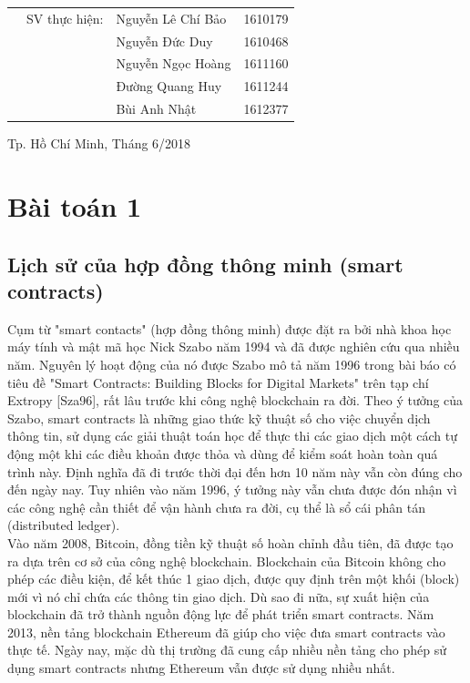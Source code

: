 \documentclass[a4paper]{article}
\begin{document}
\begin{titlepage}
\begin{table}[h]
\begin{tabular}{rrlr}
& SV thực hiện: & Nguyễn Lê Chí Bảo & 1610179 \\
& & Nguyễn Đức Duy & 1610468 \\
& & Nguyễn Ngọc Hoàng & 1611160 \\
& & Đường Quang Huy & 1611244 \\
& & Bùi Anh Nhật & 1612377 \\
\end{tabular}
\end{table}
\vspace{1.2cm}
\begin{center}
{\footnotesize Tp. Hồ Chí Minh, Tháng 6/2018}
\end{center}
\end{titlepage}



\newpage
\tableofcontents
\newpage



\section{Bài toán 1}
\subsection{Lịch sử của hợp đồng thông minh (smart contracts)}
Cụm từ "smart contacts" (hợp đồng thông minh) được đặt ra bởi nhà khoa học máy tính và mật mã học Nick Szabo năm 1994 và đã được nghiên cứu qua nhiều năm. Nguyên lý hoạt động của nó được Szabo mô tả năm 1996 trong bài báo có tiêu đề "Smart Contracts: Building Blocks for Digital Markets" trên tạp chí Extropy [Sza96], rất lâu trước khi công nghệ blockchain ra đời. Theo ý tưởng của Szabo, smart contracts là những giao thức kỹ thuật số cho việc chuyển dịch thông tin, sử dụng các giải thuật toán học để thực thi các giao dịch một cách tự động một khi các điều khoản được thỏa và dùng để kiểm soát hoàn toàn quá trình này. Định nghĩa đã đi trước thời đại đến hơn 10 năm này vẫn còn đúng cho đến ngày nay. Tuy nhiên vào năm 1996, ý tưởng này vẫn chưa được đón nhận vì các công nghệ cần thiết để vận hành chưa ra đời, cụ thể là sổ cái phân tán (distributed ledger). \\

Vào năm 2008, Bitcoin, đồng tiền kỹ thuật số hoàn chỉnh đầu tiên, đã được tạo ra dựa trên cơ sở của công nghệ blockchain. Blockchain của Bitcoin không cho phép các điều kiện, để kết thúc 1 giao dịch, được quy định trên một khối (block) mới vì nó chỉ chứa các thông tin giao dịch. Dù sao đi nữa, sự xuất hiện của blockchain đã trở thành nguồn động lực để phát triển smart contracts. Năm 2013, nền tảng blockchain Ethereum đã giúp cho việc đưa smart contracts vào thực tế. Ngày nay, mặc dù thị trường đã cung cấp nhiều nền tảng cho phép sử dụng smart contracts nhưng Ethereum vẫn được sử dụng nhiều nhất. 
\end{document}
